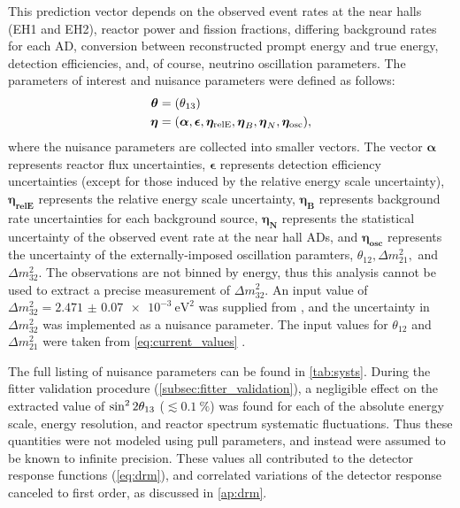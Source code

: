 This prediction vector depends on the observed event rates at the near halls (EH1 and EH2),
reactor power and fission fractions,
differing background rates for each AD,
conversion between reconstructed prompt energy and true \nuebar{} energy,
detection efficiencies,
and, of course, neutrino oscillation parameters.
The parameters of interest and nuisance parameters were defined as follows:
\begin{align}
    \begin{split}
        \boldsymbol{\theta} &= (\theta_{13}) \\
        \boldsymbol{\eta} &= (
            \boldsymbol{\alpha},
            \boldsymbol{\epsilon},
            \boldsymbol{\eta_{\text{relE}}},
            \boldsymbol{\eta}_B,
            \boldsymbol{\eta}_N,
            \boldsymbol{\eta_{\text{osc}}}),
    \end{split}
\end{align}
where the nuisance parameters are collected into smaller vectors.
The vector $\boldsymbol{\alpha}$ represents reactor flux uncertainties,
$\boldsymbol{\epsilon}$ represents detection efficiency uncertainties
(except for those induced by the relative energy scale uncertainty),
$\boldsymbol{\eta_{\text{relE}}}$ represents the relative energy scale uncertainty,
$\boldsymbol{\eta_B}$ represents background rate uncertainties for each background source,
$\boldsymbol{\eta_N}$ represents the statistical uncertainty
of the observed event rate at the near hall ADs,
and $\boldsymbol{\eta_{\text{osc}}}$ represents the uncertainty
of the externally-imposed oscillation paramters, $\theta_{12}, \Delta m^2_{21},$
and $\Delta m^2_{32}${}.
The observations are not binned by energy,
thus this analysis cannot be used to extract
a precise measurement of $\Delta m^2_{32}${}.
An input value of $\Delta m^2_{32} = \SI{2.471(70)e-3}{\eV\squared}$
was supplied from \cite{ngd2018}, and
the uncertainty in $\Delta m^2_{32}${} was implemented as a nuisance parameter.
The input values for $\theta_{12}$ and $\Delta m^2_{21}$
were taken from \cref{eq:current_values} \cite{pdg}.

The full listing of nuisance parameters
can be found in \cref{tab:systs}.
During the fitter validation procedure (\cref{subsec:fitter_validation}),
a negligible effect on the extracted value of $\sin^22\theta_{13}$
($\lesssim\SI{0.1}{\percent}$)
was found for each of the absolute energy scale, energy resolution,
and reactor \nuebar{} spectrum systematic fluctuations.
Thus these quantities were not modeled using pull parameters,
and instead were assumed to be known to infinite precision.
These values all contributed to the detector response functions
(\cref{eq:drm}),
and correlated variations of the detector response
canceled to first order, as discussed in \cref{ap:drm}.

